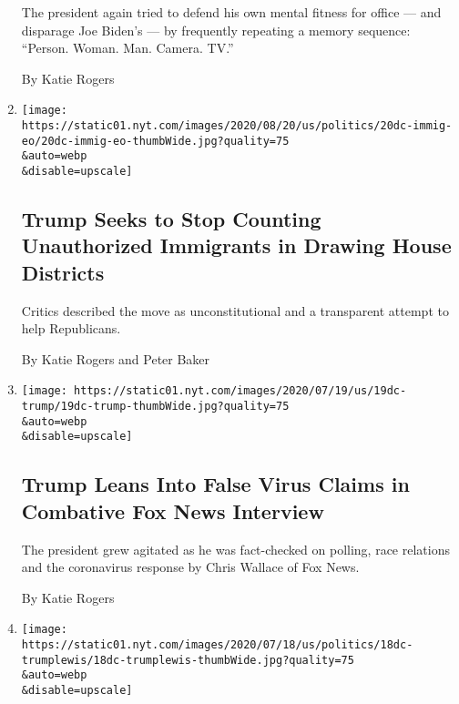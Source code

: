 \begin{enumerate}
  The president again tried to defend his own mental fitness for office
  --- and disparage Joe Biden's --- by frequently repeating a memory
  sequence: ``Person. Woman. Man. Camera. TV.''

  By Katie Rogers
\item
  \href{/2020/07/21/us/politics/trump-immigrants-census-redistricting.html}{}

  \texttt{[image: https://static01.nyt.com/images/2020/08/20/us/politics/20dc-immig-eo/20dc-immig-eo-thumbWide.jpg?quality=75\\\&auto=webp\\\&disable=upscale]}

  \hypertarget{trump-seeks-to-stop-counting-unauthorized-immigrants-in-drawing-house-districts}{%
  \subsection{Trump Seeks to Stop Counting Unauthorized Immigrants in
  Drawing House
  Districts}\label{trump-seeks-to-stop-counting-unauthorized-immigrants-in-drawing-house-districts}}

  Critics described the move as unconstitutional and a transparent
  attempt to help Republicans.

  By Katie Rogers and Peter Baker
\item
  \href{/2020/07/19/us/politics/trump-fox-interview-coronavirus-race.html}{}

  \texttt{[image: https://static01.nyt.com/images/2020/07/19/us/19dc-trump/19dc-trump-thumbWide.jpg?quality=75\\\&auto=webp\\\&disable=upscale]}

  \hypertarget{trump-leans-into-false-virus-claims-in-combative-fox-news-interview}{%
  \subsection{Trump Leans Into False Virus Claims in Combative Fox News
  Interview}\label{trump-leans-into-false-virus-claims-in-combative-fox-news-interview}}

  The president grew agitated as he was fact-checked on polling, race
  relations and the coronavirus response by Chris Wallace of Fox News.

  By Katie Rogers
\item
  \href{/2020/07/18/us/politics/john-lewis-trump.html}{}

  \texttt{[image: https://static01.nyt.com/images/2020/07/18/us/politics/18dc-trumplewis/18dc-trumplewis-thumbWide.jpg?quality=75\\\&auto=webp\\\&disable=upscale]}


\end{enumerate}
